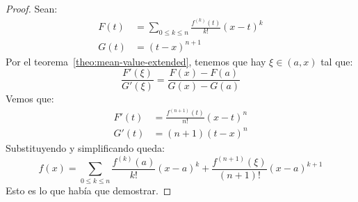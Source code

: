   \begin{proof}
    Sean:
    \begin{align*}
      F(t)
        &= \sum_{0 \le k \le n} \frac{f^{(k)}(t)}{k!} (x - t)^k \\
      G(t)
        &= (t - x)^{n + 1}
    \end{align*}
    Por el teorema~\ref{theo:mean-value-extended},
    tenemos que hay \(\xi \in (a, x)\) tal que:
    \begin{equation*}
      \frac{F'(\xi)}{G'(\xi)}
        = \frac{F(x) - F(a)}{G(x) - G(a)}
    \end{equation*}
    Vemos que:
    \begin{align*}
      F'(t)
        &= \frac{f^{(n + 1)}(t)}{n!} (x - t)^n \\
      G'(t)
        &= (n + 1) (t - x)^n
    \end{align*}
    Substituyendo y simplificando queda:
    \begin{equation*}
      f(x)
        = \sum_{0 \le k \le n} \frac{f^{(k)}(a)}{k!} (x - a)^k
            + \frac{f^{(n + 1)}(\xi)}{(n + 1)!} (x - a)^{k + 1}
    \end{equation*}
    Esto es lo que había que demostrar.
  \end{proof}

%


